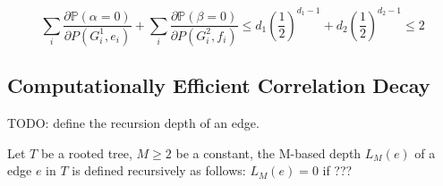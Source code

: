 	\begin{Cor}
		\[ 
			\sum_i \frac{\partial \mathbb{P}\left( \alpha = 0 \right) }{ \partial P(G_i^1, e_i) } +
			\sum_i \frac{\partial \mathbb{P}\left( \beta = 0 \right) }{ \partial P(G_i^2, f_i) } \leq
			d_1 \left( \frac{1}{2} \right)^{d_1-1} +d_2 \left( \frac{1}{2} \right)^{d_2-1} \leq
			2
		\]
	\end{Cor}

	\subsection{Computationally Efficient Correlation Decay}
	TODO: define the recursion depth of an edge.
	\begin{Def}
		Let $T$ be a rooted tree, $M\geq 2$ be a constant, the M-based depth $L_M (e)$ of a edge $e$ in $T$ is defined recursively as follows:
		$L_M (e) = 0$ if ???
	\end{Def}
